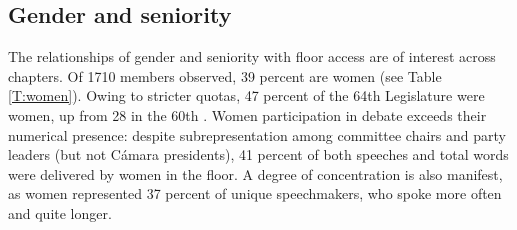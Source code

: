 \documentclass[letter,12pt]{article}
\begin{document}





  \subsection{Gender and seniority}




  The relationships of gender and seniority with floor access are of interest across chapters. Of 1710 members observed, 39 percent are women (see Table \ref{T:women}). Owing to stricter quotas, 47 percent of the 64th Legislature were women, up from 28 in the 60th \citep{piscopo.2016}. Women participation in debate exceeds their numerical presence: despite subrepresentation among committee chairs and party leaders (but not Cámara presidents), 41 percent of both speeches and total words were delivered by women in the floor. A degree of concentration is also manifest, as women represented 37 percent of unique speechmakers, who  spoke more often and quite longer. 
\end{document}
